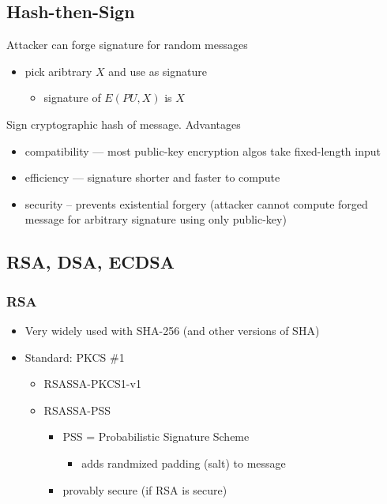 \documentclass[final]{article}
\begin{document}
\subsection{Hash-then-Sign}
Attacker can forge signature for random messages
\begin{itemize}[nosep]
    \item pick aribtrary $X$ and use as signature
          \begin{itemize}[nosep]\item signature of $E(PU, X)$ is $X$\end{itemize}
\end{itemize}
Sign cryptographic hash of message. Advantages
\begin{itemize}[nosep]
    \item compatibility --- most public-key encryption algos take fixed-length input
    \item efficiency --- signature shorter and faster to compute
    \item security -- prevents existential forgery (attacker cannot compute forged message for arbitrary signature using only public-key)
\end{itemize}
\subsection{RSA, DSA, ECDSA}
\subsubsection*{RSA}
\begin{itemize}[nosep]
    \item Very widely used with SHA-256 (and other versions of SHA)
    \item Standard: PKCS \#1
          \begin{itemize}[nosep]
              \item RSASSA-PKCS1-v1
              \item RSASSA-PSS
                    \begin{itemize}[nosep]
                        \item PSS = Probabilistic Signature Scheme
                              \begin{itemize}[nosep]\item adds randmized padding (salt) to message\end{itemize}
                        \item provably secure (if RSA is secure)
                    \end{itemize}
          \end{itemize}
\end{itemize}
\end{document}
